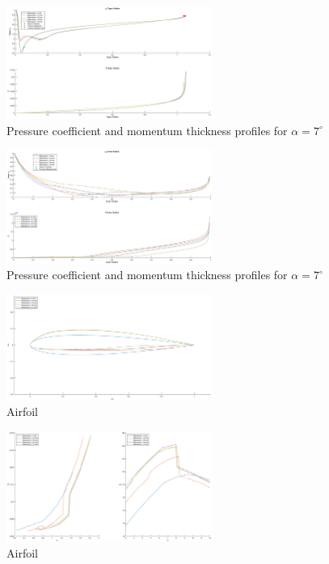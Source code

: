 \documentclass{article}
\begin{document}
\begin{figure}[H]
    \centering
    \includegraphics[width=0.6\textwidth]{figures/hiRe_upperprofile_14_a7.eps}
    \caption{Pressure coefficient and momentum thickness profiles for $\alpha = 7^\circ$}
    \label{fig:airfoil}
\end{figure}
\begin{figure}[H]
    \centering
    \includegraphics[width=0.6\textwidth]{figures/hiRe_lowerprofile_14_a7.eps}
    \caption{Pressure coefficient and momentum thickness profiles for $\alpha = 7^\circ$}
    \label{fig:airfoil}
\end{figure}
\begin{figure}[H]
    \centering
    \includegraphics[width=0.6\textwidth]{figures/hiRe_geometry_17.eps}
    \caption{Airfoil}
    \label{fig:airfoil}
\end{figure}
\begin{figure}[H]
    \centering
    \includegraphics[width=0.6\textwidth]{figures/hiRe_lod_17.eps}
    \caption{Airfoil}
    \label{fig:airfoil}
\end{figure}
\end{document}
